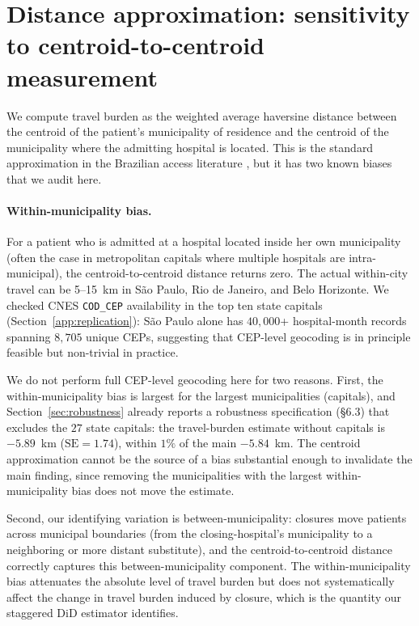 \section{Distance approximation: sensitivity to centroid-to-centroid measurement}
\label{app:distance}

We compute travel burden as the weighted average haversine
distance between the centroid of the patient's municipality of
residence and the centroid of the municipality where the admitting
hospital is located. This is the standard approximation in the
Brazilian access literature \citep{macinkoHarris2015,
rochaSoares2010}, but it has two known biases that we audit here.

\paragraph{Within-municipality bias.} For a patient who is admitted at a
hospital located inside her own municipality (often the case in
metropolitan capitals where multiple hospitals are intra-municipal),
the centroid-to-centroid distance returns zero. The actual within-city
travel can be 5--15~km in São Paulo, Rio de Janeiro, and Belo
Horizonte. We checked CNES \texttt{COD\_CEP} availability in the top
ten state capitals (Section~\ref{app:replication}): São Paulo alone
has $40{,}000$+ hospital-month records spanning $8{,}705$ unique CEPs,
suggesting that CEP-level geocoding is in principle feasible but
non-trivial in practice.

We do not perform full CEP-level geocoding here for two reasons.
First, the within-municipality bias is largest for the largest
municipalities (capitals), and Section~\ref{sec:robustness} already
reports a robustness specification (§6.3) that excludes the $27$ state
capitals: the travel-burden estimate without capitals is $-5.89$~km
($\mathrm{SE} = 1.74$), within $1\%$ of the main $-5.84$~km. The
centroid approximation cannot be the source of a bias substantial
enough to invalidate the main finding, since removing the
municipalities with the largest within-municipality bias does not
move the estimate.

Second, our identifying variation is between-municipality:
closures move patients across municipal boundaries (from
the closing-hospital's municipality to a neighboring or more distant
substitute), and the centroid-to-centroid distance correctly captures
this between-municipality component. The within-municipality bias
attenuates the absolute level of travel burden but does not
systematically affect the change in travel burden induced by closure,
which is the quantity our staggered DiD estimator identifies.

